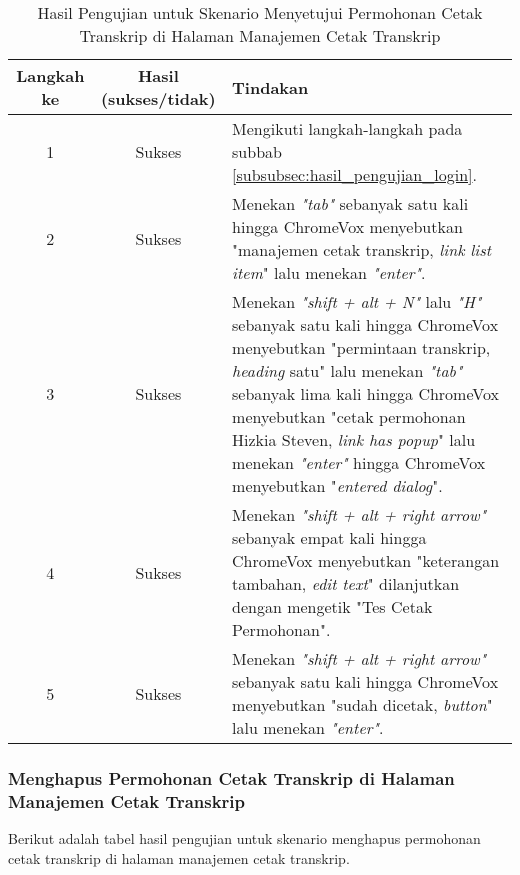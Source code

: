 \begin{table}[H]
    \centering 
    \caption{Hasil Pengujian untuk Skenario Menyetujui Permohonan Cetak Transkrip di Halaman Manajemen Cetak Transkrip}
    \label{tab:hasil_pengujian_menyetujui_permohonan_cetak_transkrip_di_halaman_manajemen_cetak_transkrip}
    \begin{tabular}{|c|c|p{10cm}|}
        \toprule
        Langkah ke & Hasil (sukses/tidak) & Tindakan \\

        \midrule
        1 & Sukses & Mengikuti langkah-langkah pada subbab \ref{subsubsec:hasil_pengujian_login}. \\
        2 & Sukses & Menekan \textit{"tab"} sebanyak satu kali hingga ChromeVox menyebutkan "manajemen cetak transkrip, \textit{link list item}" lalu menekan \textit{"enter"}. \\
        3 & Sukses & Menekan \textit{"shift + alt + N"} lalu \textit{"H"} sebanyak satu kali hingga ChromeVox menyebutkan "permintaan transkrip, \textit{heading} satu" lalu menekan \textit{"tab"} sebanyak lima kali hingga ChromeVox menyebutkan "cetak permohonan Hizkia Steven, \textit{link has popup}" lalu menekan \textit{"enter"} hingga ChromeVox menyebutkan "\textit{entered dialog}". \\
        4 & Sukses & Menekan \textit{"shift + alt + right arrow"} sebanyak empat kali hingga ChromeVox menyebutkan "keterangan tambahan, \textit{edit text}" dilanjutkan dengan mengetik "Tes Cetak Permohonan". \\
        5 & Sukses & Menekan \textit{"shift + alt + right arrow"} sebanyak satu kali hingga ChromeVox menyebutkan "sudah dicetak, \textit{button}" lalu menekan \textit{"enter"}. \\ 

        \bottomrule

    \end{tabular}
\end{table}

\subsubsection{Menghapus Permohonan Cetak Transkrip di Halaman Manajemen Cetak Transkrip}
\label{subsubsec:hasil_pengujian_menghapus_permohonan_cetak_transkrip_di_halaman_manajemen_cetak_transkrip}
Berikut adalah tabel hasil pengujian untuk skenario menghapus permohonan cetak transkrip di halaman manajemen cetak transkrip.

